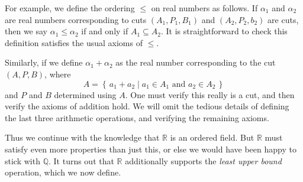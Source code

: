 \documentclass[11pt,oneside]{amsbook}
\newcommand{\set}[1]{\left\{\,#1\,\right\}}
\newcommand{\Q}{\mathbb Q}
\newcommand{\R}{\mathbb R}
\renewcommand{\setminus}{\smallsetminus}
\theoremstyle{definition}
\theoremstyle{plain}
\theoremstyle{definition}
\newtheorem{definition}[theorem]{Definition}
\theoremstyle{remark}
\numberwithin{equation}{section}
\numberwithin{figure}{section}
\begin{document}
For example, we define the ordering $\leq$ on real numbers as follows. If $\alpha_1$ and $\alpha_2$ are real numbers corresponding to cuts $(A_1,P_1,B_1)$ and $(A_2,P_2,b_2)$ are cuts, then we say $\alpha_1\leq\alpha_2$ if and only if $A_1\subseteq A_2$. It is straightforward to check this definition satisfies the usual axioms of $\leq$.

Similarly, if we define $\alpha_1+\alpha_2$ as the real number corresponding to the cut $(A,P,B)$, where
\[A=\set{a_1+a_2\mid a_1\in A_1\text{ and }a_2\in A_2}
\]
and $P$ and $B$ determined using $A$. One must verify this really is a cut, and then verify the axioms of addition hold. We will omit the tedious details of defining the last three arithmetic operations, and verifying the remaining axioms.

Thus we continue with the knowledge that $\R$ is an ordered field. But $\R$ must satisfy even more properties than just this, or else we would have been happy to stick with $\Q$. It turns out that $\R$ additionally supports the \emph{least upper bound} operation, which we now define.

% 

\end{document}
